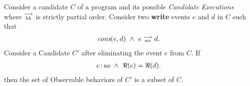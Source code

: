 \begin{theorem}
    \label{WriteElim}
    Consider a candidate $C$ of a program and its possible \textit{Candidate Executions} where $\stackrel{\longrightarrow}{_\textit{hb}}$ is strictly partial order. 
    Consider two \textbf{write} events $e$ and $d$ in $C$ such that 
    \begin{align*}
        \textit{cons}(e,d) \ \wedge \ e\stackrel{\longrightarrow}{_{ao}}d. 
    \end{align*}
    Consider a Candidate $C'$ after eliminating the event $e$ from $C$.  
    If
    \begin{align*}
        e\!:\!\textit{uo} \ \wedge \ \Re(e) = \Re(d). 
    \end{align*}
    then the set of Observable behaviors of $C'$ is a subset of $C$.  
\end{theorem}